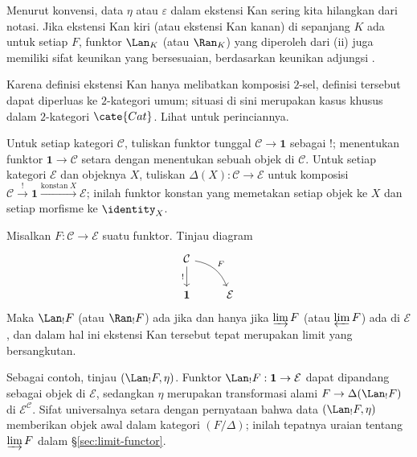 Menurut konvensi, data $\eta$ atau $\varepsilon$ dalam ekstensi Kan sering kita
hilangkan dari notasi. Jika ekstensi Kan kiri (atau ekstensi Kan kanan) di
sepanjang $K$ ada untuk setiap $F$, funktor $\Lan_K$ (atau $\Ran_K$) yang
diperoleh dari (ii) juga memiliki sifat keunikan yang bersesuaian, berdasarkan
keunikan adjungsi \cite[Proposisi 2.6.10]{Li1}.

\begin{catatan}
	Karena definisi ekstensi Kan hanya melibatkan komposisi $2$-sel, definisi
	tersebut dapat diperluas ke $2$-kategori umum; situasi di sini merupakan
	kasus khusus dalam $2$-kategori $\cate{Cat}$. Lihat
	\cite[\S 3.5]{Li1} untuk perinciannya.
\end{catatan}

Untuk setiap kategori $\mathcal{C}$, tuliskan funktor tunggal
$\mathcal{C} \to \mathbf{1}$ sebagai $!$; menentukan funktor
$\mathbf{1} \to \mathcal{C}$ setara dengan menentukan sebuah objek di
$\mathcal{C}$. Untuk setiap kategori $\mathcal{E}$ dan objeknya $X$, tuliskan
$\Delta(X): \mathcal{C} \to \mathcal{E}$ untuk komposisi
$\mathcal{C} \xrightarrow{!} \mathbf{1} \xrightarrow{\text{konstan}\; X}
\mathcal{E}$; inilah funktor konstan yang memetakan setiap objek ke $X$ dan
setiap morfisme ke $\identity_X$.

\begin{contoh}\label{eg:limit-as-Kan}
	Misalkan $F: \mathcal{C} \to \mathcal{E}$ suatu funktor. Tinjau diagram
	\[\begin{tikzcd}
		\mathcal{C} \arrow[d, "!"'] \arrow[rd, bend left, "F"] & \\
		\mathbf{1} & \mathcal{E}
	\end{tikzcd}\]
	Maka $\Lan_! F$ (atau $\Ran_! F$) ada jika dan hanya jika
	$\varinjlim F$ (atau $\varprojlim F$) ada di $\mathcal{E}$, dan dalam hal
	ini ekstensi Kan tersebut tepat merupakan limit yang bersangkutan.

	Sebagai contoh, tinjau $(\Lan_! F, \eta)$. Funktor
	$\Lan_! F: \mathbf{1} \to \mathcal{E}$ dapat dipandang sebagai objek di
	$\mathcal{E}$, sedangkan $\eta$ merupakan transformasi alami
	$F \to \Delta(\Lan_! F)$ di $\mathcal{E}^{\mathcal{C}}$. Sifat universalnya
	setara dengan pernyataan bahwa data $(\Lan_! F, \eta)$ memberikan objek awal
	dalam kategori $(F/\Delta)$; inilah tepatnya uraian tentang $\varinjlim F$
	dalam \S\ref{sec:limit-functor}.
\end{contoh}

